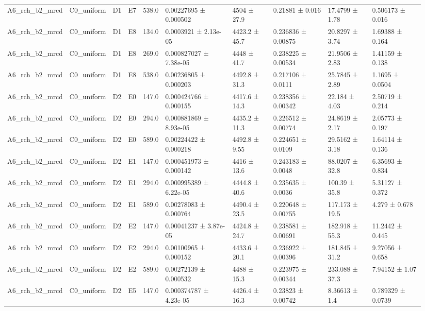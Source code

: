 \begin{table}
\begin{tabular}{llllllllll}
A6\_rch\_b2\_mrcd & C0\_uniform & D1 & E7 & 538.0 & 0.00227695 ± 0.000502 & 4504 ± 27.9 & 0.21881 ± 0.016 & 17.4799 ± 1.78 & 0.506173 ± 0.016 \\
A6\_rch\_b2\_mrcd & C0\_uniform & D1 & E8 & 134.0 & 0.0003921 ± 2.13e-05 & 4423.2 ± 45.7 & 0.236836 ± 0.00875 & 20.8297 ± 3.74 & 1.69388 ± 0.164 \\
A6\_rch\_b2\_mrcd & C0\_uniform & D1 & E8 & 269.0 & 0.000827027 ± 7.38e-05 & 4448 ± 41.7 & 0.238225 ± 0.00534 & 21.9506 ± 2.83 & 1.41159 ± 0.138 \\
A6\_rch\_b2\_mrcd & C0\_uniform & D1 & E8 & 538.0 & 0.00236805 ± 0.000203 & 4492.8 ± 31.3 & 0.217106 ± 0.0111 & 25.7845 ± 2.89 & 1.1695 ± 0.0504 \\
A6\_rch\_b2\_mrcd & C0\_uniform & D2 & E0 & 147.0 & 0.000424766 ± 0.000155 & 4417.6 ± 14.3 & 0.238356 ± 0.00342 & 22.184 ± 4.03 & 2.50719 ± 0.214 \\
A6\_rch\_b2\_mrcd & C0\_uniform & D2 & E0 & 294.0 & 0.000881869 ± 8.93e-05 & 4435.2 ± 11.3 & 0.226512 ± 0.00774 & 24.8619 ± 2.17 & 2.05773 ± 0.197 \\
A6\_rch\_b2\_mrcd & C0\_uniform & D2 & E0 & 589.0 & 0.00224422 ± 0.000218 & 4492.8 ± 9.55 & 0.224651 ± 0.0109 & 29.5162 ± 3.18 & 1.64114 ± 0.136 \\
A6\_rch\_b2\_mrcd & C0\_uniform & D2 & E1 & 147.0 & 0.000451973 ± 0.000142 & 4416 ± 13.6 & 0.243183 ± 0.0048 & 88.0207 ± 32.8 & 6.35693 ± 0.834 \\
A6\_rch\_b2\_mrcd & C0\_uniform & D2 & E1 & 294.0 & 0.000995389 ± 6.22e-05 & 4444.8 ± 40.6 & 0.235635 ± 0.0036 & 100.39 ± 35.8 & 5.31127 ± 0.372 \\
A6\_rch\_b2\_mrcd & C0\_uniform & D2 & E1 & 589.0 & 0.00278083 ± 0.000764 & 4490.4 ± 23.5 & 0.220648 ± 0.00755 & 117.173 ± 19.5 & 4.279 ± 0.678 \\
A6\_rch\_b2\_mrcd & C0\_uniform & D2 & E2 & 147.0 & 0.00041237 ± 3.87e-05 & 4424.8 ± 24.7 & 0.238581 ± 0.00691 & 182.918 ± 55.3 & 11.2442 ± 0.445 \\
A6\_rch\_b2\_mrcd & C0\_uniform & D2 & E2 & 294.0 & 0.00100965 ± 0.000152 & 4433.6 ± 20.1 & 0.236922 ± 0.00396 & 181.845 ± 31.2 & 9.27056 ± 0.658 \\
A6\_rch\_b2\_mrcd & C0\_uniform & D2 & E2 & 589.0 & 0.00272139 ± 0.000532 & 4488 ± 15.3 & 0.223975 ± 0.00344 & 233.088 ± 37.3 & 7.94152 ± 1.07 \\
A6\_rch\_b2\_mrcd & C0\_uniform & D2 & E5 & 147.0 & 0.000374787 ± 4.23e-05 & 4426.4 ± 16.3 & 0.23823 ± 0.00742 & 8.36613 ± 1.4 & 0.789329 ± 0.0739 \\

\end{tabular}
\end{table}
